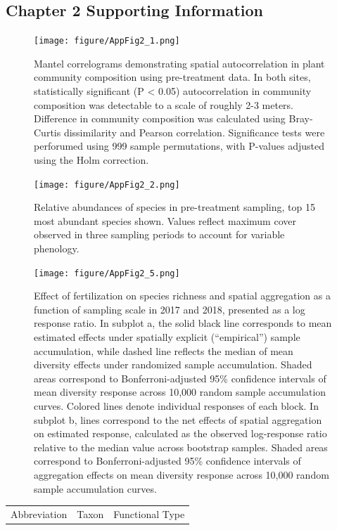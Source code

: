 \documentclass[twoside,12pt,final]{ucthesis-CA2012}
\begin{document}
\begin{ucmainmatter}
{\chapter{Chapter 2 Supporting Information}\label{chapter-2-supporting-information}}
\begin{figure}
\centering
\texttt{[image: figure/AppFig2\_1.png]}
\caption{Mantel correlograms demonstrating spatial autocorrelation in plant community composition using pre-treatment data. In both sites, statistically significant (P \textless{} 0.05) autocorrelation in community composition was detectable to a scale of roughly 2-3 meters. Difference in community composition was calculated using Bray-Curtis dissimilarity and Pearson correlation. Significance tests were perforumed using 999 sample permutations, with P-values adjusted using the Holm correction. \label{app-2-1}}
\end{figure}
\begin{figure}
\centering
\texttt{[image: figure/AppFig2\_2.png]}
\caption{Relative abundances of species in pre-treatment sampling, top 15 most abundant species shown. Values reflect maximum cover observed in three sampling periods to account for variable phenology. \label{app-2-2}}
\end{figure}
\begin{figure}
\centering
\texttt{[image: figure/AppFig2\_5.png]}
\caption{Effect of fertilization on species richness and spatial aggregation as a function of sampling scale in 2017 and 2018, presented as a log response ratio. In subplot a, the solid black line corresponds to mean estimated effects under spatially explicit (``empirical'') sample accumulation, while dashed line reflects the median of mean diversity effects under randomized sample accumulation. Shaded areas correspond to Bonferroni-adjusted 95\% confidence intervals of mean diversity response across 10,000 random sample accumulation curves. Colored lines denote individual responses of each block. In subplot b, lines correspond to the net effects of spatial aggregation on estimated response, calculated as the observed log-response ratio relative to the median value across bootstrap samples. Shaded areas correspond to Bonferroni-adjusted 95\% confidence intervals of aggregation effects on mean diversity response across 10,000 random sample accumulation curves. \label{app-2-5}}
\end{figure}
\begin{table}[ht]
\centering
\begin{tabular}{lll}
  \hline
Abbreviation & Taxon & Functional Type \\ 

\end{tabular}
\end{table}
\end{ucmainmatter}
\end{document}
